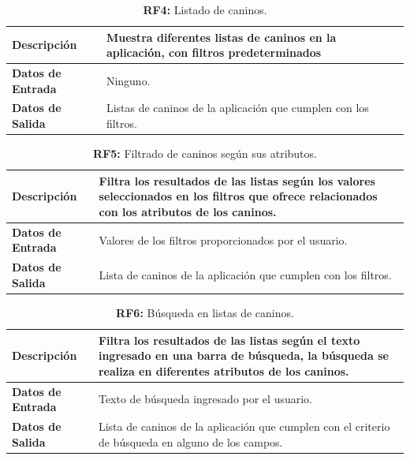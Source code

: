\documentclass[a4paper, 12pt]{article}
\begin{document}
\begin{table}[H]
\captionsetup{list=no}%
\captionsetup{justification=raggedright,singlelinecheck=false}
\captionsetup{labelformat=empty}
\caption{\textbf{RF4:} Listado de caninos.}
\label{tab:RF4}
	\begin{tabular}{|m{5cm}|m{10cm}|}
	\hline
	\textbf{Descripción} & Muestra diferentes listas de caninos en la aplicación, con filtros predeterminados \\ 
	\hline
	\textbf{Datos de Entrada} & Ninguno. \\ 
	\hline
	\textbf{Datos de Salida} & Listas de caninos de la aplicación que cumplen con los filtros. \\ 
	\hline
\end{tabular}
\end{table}

\begin{table}[H]
\captionsetup{list=no}%
\captionsetup{justification=raggedright,singlelinecheck=false}
\captionsetup{labelformat=empty}
\caption{\textbf{RF5:} Filtrado de caninos según sus atributos.}
\label{tab:RF5}
	\begin{tabular}{|m{5cm}|m{10cm}|}
	\hline
	\textbf{Descripción} & Filtra los resultados de las listas según los valores seleccionados en los filtros que ofrece relacionados con los atributos de los caninos. \\ 
	\hline
	\textbf{Datos de Entrada} & Valores de los filtros proporcionados por el usuario. \\ 
	\hline
	\textbf{Datos de Salida} & Lista de caninos de la aplicación que cumplen con los filtros. \\ 
	\hline
\end{tabular}
\end{table}

\begin{table}[H]
\captionsetup{list=no}%
\captionsetup{justification=raggedright,singlelinecheck=false}
\captionsetup{labelformat=empty}
\caption{\textbf{RF6:} Búsqueda en listas de caninos.}
\label{tab:RF6}
	\begin{tabular}{|m{5cm}|m{10cm}|}
	\hline
	\textbf{Descripción} & Filtra los resultados de las listas según el texto ingresado en una barra de búsqueda, la búsqueda se realiza en diferentes atributos de los caninos. \\ 
	\hline
	\textbf{Datos de Entrada} & Texto de búsqueda ingresado por el usuario. \\ 
	\hline
	\textbf{Datos de Salida} &  Lista de caninos de la aplicación que cumplen con el criterio de búsqueda en alguno de los campos. \\ 
	\hline
\end{tabular}
\end{table}
\end{document}
